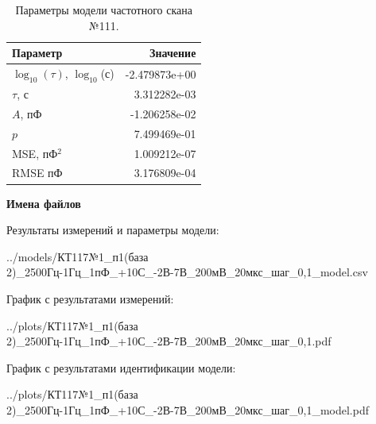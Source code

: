 \begin{table}[!ht]
    \centering
    \caption{Параметры модели частотного скана №111.}
    \begin{tabular}{|l|r|}
        \hline
        Параметр                                       & Значение                  \\ \hline
        $\log_{10}(\tau)$, $\log_{10}$(с)              & -2.479873e+00             \\ \hline
        $\tau$, с                                      & 3.312282e-03              \\ \hline
        $A$, пФ                                        & -1.206258e-02             \\ \hline
        $p$                                            & 7.499469e-01              \\ \hline
        MSE, пФ$^2$                                    & 1.009212e-07              \\ \hline
        RMSE пФ                                        & 3.176809e-04              \\ \hline
    \end{tabular}
    \label{table:frequency_scan_model_111}
\end{table}

\textbf{Имена файлов}

Результаты измерений и параметры модели:

\scriptsize../models/КТ117№1\_п1(база 2)\_2500Гц-1Гц\_1пФ\_+10С\_-2В-7В\_200мВ\_20мкс\_шаг\_0,1\_model.csv
\normalsize

График с результатами измерений:

\scriptsize../plots/КТ117№1\_п1(база 2)\_2500Гц-1Гц\_1пФ\_+10С\_-2В-7В\_200мВ\_20мкс\_шаг\_0,1.pdf
\normalsize

График с результатами идентификации модели:

\scriptsize../plots/КТ117№1\_п1(база 2)\_2500Гц-1Гц\_1пФ\_+10С\_-2В-7В\_200мВ\_20мкс\_шаг\_0,1\_model.pdf
\normalsize

